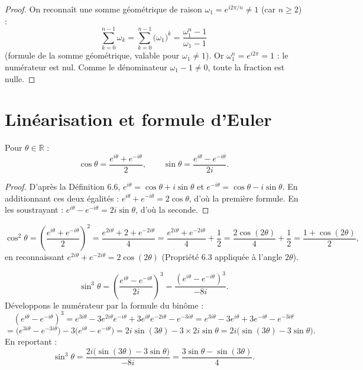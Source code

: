 \documentclass[a4paper,12pt,openany]{book}
\begin{document}
\begin{proof}
On reconnaît une somme géométrique de raison $\omega_1 = e^{i2\pi/n}
\neq 1$ (car $n\geq2$) :
\[
\sum_{k=0}^{n-1} \omega_k = \sum_{k=0}^{n-1} \big(\omega_1\big)^k =
\frac{\omega_1^n - 1}{\omega_1 - 1}
\]
(formule de la somme géométrique, valable pour $\omega_1\neq1$). Or
$\omega_1^n = e^{i2\pi} = 1$ : le numérateur est nul. Comme le
dénominateur $\omega_1-1\neq0$, toute la fraction est nulle.
\end{proof}

\section{Linéarisation et formule d'Euler}


\begin{proposition}
Pour $\theta\in\mathbb{R}$ :
\[
\cos\theta = \frac{e^{i\theta}+e^{-i\theta}}{2}, \qquad
\sin\theta = \frac{e^{i\theta}-e^{-i\theta}}{2i}.
\]
\end{proposition}

\begin{proof}
D'après la Définition 6.6, $e^{i\theta}=\cos\theta+i\sin\theta$ et
$e^{-i\theta}=\cos\theta-i\sin\theta$. En additionnant ces deux
égalités : $e^{i\theta}+e^{-i\theta} = 2\cos\theta$, d'où la première
formule. En les soustrayant : $e^{i\theta}-e^{-i\theta} = 2i\sin\theta$,
d'où la seconde.
\end{proof}

\begin{exemple}
\[
\cos^2\theta = \left(\frac{e^{i\theta}+e^{-i\theta}}{2}\right)^2 =
\frac{e^{2i\theta}+2+e^{-2i\theta}}{4} =
\frac{e^{2i\theta}+e^{-2i\theta}}{4} + \frac12
= \frac{2\cos(2\theta)}{4}+\frac12 = \frac{1+\cos(2\theta)}{2},
\]
en reconnaissant $e^{2i\theta}+e^{-2i\theta}=2\cos(2\theta)$ (Propriété
6.3 appliquée à l'angle $2\theta$).
\end{exemple}

\begin{exemple}
\[
\sin^3\theta = \left(\frac{e^{i\theta}-e^{-i\theta}}{2i}\right)^3 =
\frac{(e^{i\theta}-e^{-i\theta})^3}{-8i}.
\]
Développons le numérateur par la formule du binôme :
\[
(e^{i\theta}-e^{-i\theta})^3 = e^{3i\theta} - 3e^{2i\theta}e^{-i\theta} +
3e^{i\theta}e^{-2i\theta} - e^{-3i\theta}
= e^{3i\theta} - 3e^{i\theta} + 3e^{-i\theta} - e^{-3i\theta}
\]
\[
= \big(e^{3i\theta}-e^{-3i\theta}\big) - 3\big(e^{i\theta}-e^{-i\theta}\big)
= 2i\sin(3\theta) - 3\times2i\sin\theta = 2i\big(\sin(3\theta)-3\sin\theta\big).
\]
En reportant :
\[
\sin^3\theta = \frac{2i\big(\sin(3\theta)-3\sin\theta\big)}{-8i} =
\frac{3\sin\theta - \sin(3\theta)}{4}.
\]
\end{exemple}
\end{document}
